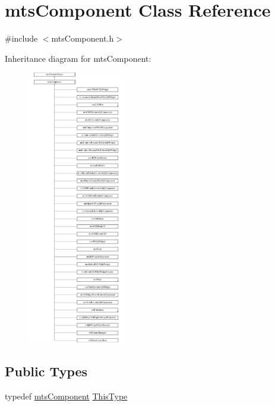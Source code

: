 \hypertarget{classmts_component}{}\section{mts\+Component Class Reference}
\label{classmts_component}


{\ttfamily \#include $<$mts\+Component.\+h$>$}

Inheritance diagram for mts\+Component\+:\begin{figure}[H]
\begin{center}
\leavevmode
\includegraphics[height=12.000000cm]{d6/d28/classmts_component}
\end{center}
\end{figure}
\subsection*{Public Types}
\begin{DoxyCompactItemize}
\item 
typedef \hyperlink{classmts_component}{mts\+Component} \hyperlink{classmts_component_a938b0f369786119d9fa6426a2e3df112}{This\+Type}
\end{DoxyCompactItemize}
